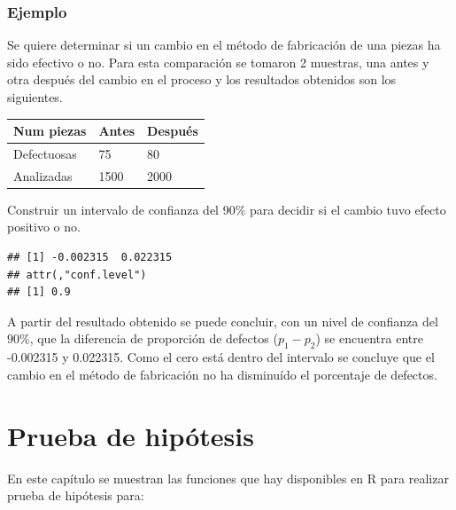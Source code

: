 \documentclass[10pt,]{krantz}
\makeatletter
\newenvironment{Shaded}{\begin{snugshade}}{\end{snugshade}}
\newcommand{\KeywordTok}[1]{\textcolor[rgb]{0.13,0.29,0.53}{\textbf{#1}}}
\newcommand{\DataTypeTok}[1]{\textcolor[rgb]{0.13,0.29,0.53}{#1}}
\newcommand{\DecValTok}[1]{\textcolor[rgb]{0.00,0.00,0.81}{#1}}
\newcommand{\FloatTok}[1]{\textcolor[rgb]{0.00,0.00,0.81}{#1}}
\newcommand{\OperatorTok}[1]{\textcolor[rgb]{0.81,0.36,0.00}{\textbf{#1}}}
\newcommand{\NormalTok}[1]{#1}
\let\proglang=\textsf
\newenvironment{kframe}{%
\medskip{}
\setlength{\fboxsep}{.8em}
 \def\at@end@of@kframe{}%
 \ifinner\ifhmode%
  \def\at@end@of@kframe{\end{minipage}}%
  \begin{minipage}{\columnwidth}%
 \fi\fi%
 \def\FrameCommand##1{\hskip\@totalleftmargin \hskip-\fboxsep
 \colorbox{shadecolor}{##1}\hskip-\fboxsep
     \hskip-\linewidth \hskip-\@totalleftmargin \hskip\columnwidth}%
 \MakeFramed {\advance\hsize-\width
   \@totalleftmargin\z@ \linewidth\hsize
   \@setminipage}}%
 {\par\unskip\endMakeFramed%
 \at@end@of@kframe}
\renewenvironment{Shaded}{\begin{kframe}}{\end{kframe}}
\makeatother
\begin{document}
\subsection*{Ejemplo}\label{ejemplo-61}


Se quiere determinar si un cambio en el método de fabricación de una
piezas ha sido efectivo o no. Para esta comparación se tomaron 2
muestras, una antes y otra después del cambio en el proceso y los
resultados obtenidos son los siguientes.

\begin{longtable}[]{@{}lll@{}}
\toprule
Num piezas & Antes & Después\tabularnewline
\midrule
\endhead
Defectuosas & 75 & 80\tabularnewline
Analizadas & 1500 & 2000\tabularnewline
\bottomrule
\end{longtable}

Construir un intervalo de confianza del 90\% para decidir si el cambio
tuvo efecto positivo o no.

\begin{Shaded}
\end{Shaded}

\begin{verbatim}
## [1] -0.002315  0.022315
## attr(,"conf.level")
## [1] 0.9
\end{verbatim}

A partir del resultado obtenido se puede concluir, con un nivel de
confianza del \(90\%\), que la diferencia de proporción de defectos
(\(p_1 - p_2\)) se encuentra entre -0.002315 y 0.022315. Como el cero
está dentro del intervalo se concluye que el cambio en el método de
fabricación no ha disminuído el porcentaje de defectos.

\chapter{\texorpdfstring{Prueba de hipótesis
}{Prueba de hipótesis }}\label{prueba-de-hipotesis}

En este capítulo se muestran las funciones que hay disponibles en
\proglang{R} para realizar prueba de hipótesis para:
\end{document}

